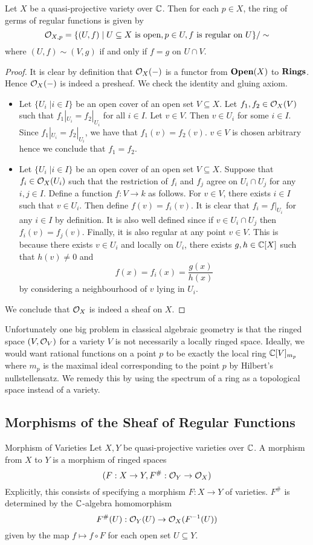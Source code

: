 \documentclass[a4paper]{article}
\begin{document}
\begin{lmm}{}{} Let $X$ be a quasi-projective variety over $\mathbb{C}$. Then for each $p\in X$, the ring of germs of regular functions is given by $$\mathcal{O}_{X,p}=\{(U,f)\;|\;U\subseteq X\text{ is open}, p\in U, f\text{ is regular on }U\}/\sim$$ where $(U,f)\sim(V,g)$ if and only if $f=g$ on $U\cap V$. \tcbline
\begin{proof}
It is clear by definition that $\mathcal{O}_X(-)$ is a functor from $\bold{Open}(X)$ to $\bold{Rings}$. Hence $\mathcal{O}_X(-)$ is indeed a presheaf. We check the identity and gluing axiom. 
\begin{itemize}
\item Let $\{U_i\;|i\in I\}$ be an open cover of an open set $V\subseteq X$. Let $f_1,f_2\in\mathcal{O}_X(V)$ such that $f_1|_{U_i}=f_2|_{U_i}$ for all $i\in I$. Let $v\in V$. Then $v\in U_i$ for some $i\in I$. Since $f_1|_{U_i}=f_2|_{U_i}$, we have that $f_1(v)=f_2(v)$. $v\in V$ is chosen arbitrary hence we conclude that $f_1=f_2$. 
\item Let $\{U_i\;|i\in I\}$ be an open cover of an open set $V\subseteq X$. Suppose that $f_i\in\mathcal{O}_X(U_i)$ such that the restriction of $f_i$ and $f_j$ agree on $U_i\cap U_j$ for any $i,j\in I$. Define a function $f:V\to k$ as follows. For $v\in V$, there exists $i\in I$ such that $v\in U_i$. Then define $f(v)=f_i(v)$. It is clear that $f_i=f|_{U_i}$ for any $i\in I$ by definition. It is also well defined since if $v\in U_i\cap U_j$ then $f_i(v)=f_j(v)$. Finally, it is also regular at any point $v\in V$. This is because there exists $v\in U_i$ and locally on $U_i$, there exists $g,h\in\mathbb{C}[X]$ such that $h(v)\neq 0$ and $$f(x)=f_i(x)=\frac{g(x)}{h(x)}$$ by considering a neighbourhood of $v$ lying in $U_i$. 
\end{itemize}
We conclude that $\mathcal{O}_X$ is indeed a sheaf on $X$. 
\end{proof}
\end{lmm}

Unfortunately one big problem in classical algebraic geometry is that the ringed space $(V,\mathcal{O}_V)$ for a variety $V$ is not necessarily a locally ringed space. Ideally, we would want rational functions on a point $p$ to be exactly the local ring $\mathbb{C}[V]_{m_p}$ where $m_p$ is the maximal ideal corresponding to the point $p$ by Hilbert's nullstellensatz. We remedy this by using the spectrum of a ring as a topological space instead of a variety. 

\subsection{Morphisms of the Sheaf of Regular Functions}
\begin{defn}{Morphism of Varieties}{} Let $X,Y$ be quasi-projective varieties over $\mathbb{C}$. A morphism from $X$ to $Y$ is a morphism of ringed spaces $$(F:X\to Y,F^\#:\mathcal{O}_Y\to\mathcal{O}_X)$$ Explicitly, this consists of specifying a morphism $F:X\to Y$ of varieties. $F^\#$ is determined by the $\mathbb{C}$-algebra homomorphism $$F^\#(U):\mathcal{O}_Y(U)\to\mathcal{O}_X(F^{-1}(U))$$ given by the map $f\mapsto f\circ F$ for each open set $U\subseteq Y$. 
\end{defn}
\end{document}
